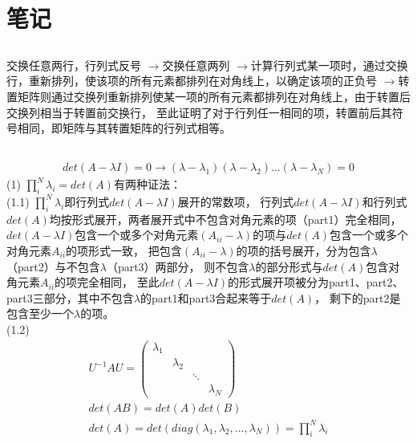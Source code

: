 \section{笔记}

\subsection{}
交换任意两行，行列式反号
$\rightarrow$交换任意两列
$\rightarrow$计算行列式某一项时，通过交换行，重新排列，使该项的所有元素都排列在对角线上，以确定该项的正负号
$\rightarrow$转置矩阵则通过交换列重新排列使某一项的所有元素都排列在对角线上，由于转置后交换列相当于转置前交换行，
至此证明了对于行列任一相同的项，转置前后其符号相同，即矩阵与其转置矩阵的行列式相等。

\subsection{}
\begin{gather}
    det(A-\lambda I)=0
    \rightarrow (\lambda - \lambda_{1})(\lambda - \lambda_{2})...(\lambda - \lambda_{N})=0
\end{gather}
(1) $\prod_{i}^{N} \lambda_{i}=det(A)$有两种证法：\\
(1.1)  $\prod_{i}^{N}\lambda_{i}$即行列式$det(A-\lambda I)$展开的常数项，
行列式$det(A-\lambda I)$和行列式$det(A)$均按形式展开，两者展开式中不包含对角元素的项（part1）完全相同，
$det(A-\lambda I)$包含一个或多个对角元素$(A_{ii}-\lambda)$的项与$det(A)$包含一个或多个对角元素$A_{ii}$的项形式一致，
把包含$(A_{ii}-\lambda)$的项的括号展开，分为包含$\lambda$（part2）与不包含$\lambda$（part3）两部分，
则不包含$\lambda$的部分形式与$det(A)$包含对角元素$A_{ii}$的项完全相同，
至此$det(A-\lambda I)$的形式展开项被分为part1、part2、part3三部分，其中不包含$\lambda$的part1和part3合起来等于$det(A)$，
剩下的part2是包含至少一个$\lambda$的项。\\
(1.2)
\begin{gather}
    U^{-1}AU
    =\begin{pmatrix}
        \lambda_{1} &  &  & \\
         & \lambda_{2} &  & \\
         &  & \ddots & \\
         &  &  & \lambda_{N}
    \end{pmatrix}\\
    det(AB)=det(A)det(B)\\
    det(A)=det(diag(\lambda_{1}, \lambda_{2}, ..., \lambda_{N}))=\prod_{i}^{N} \lambda_{i}
\end{gather}
